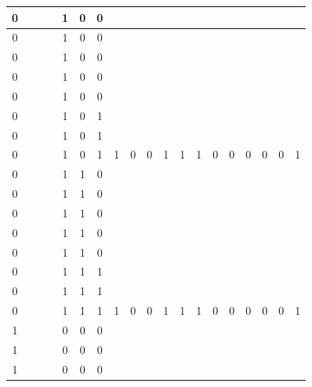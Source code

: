 \begin{table}[!tb]
\begin{tabular}{|c|c|c|c|c|c|c|c|c|c|c|c|c|c|c|c|c|c|c|}
        \rowcolor{red!40} 0 &  &  &  & 1 & 0 & 0 &  &  &  &  &  &  &  &  &  &  &  &  \\ \hline
        \rowcolor{red!40} 0 &  &  &  & 1 & 0 & 0 &  &  &  &  &  &  &  &  &  &  &  &  \\ \hline
        \rowcolor{red!40} 0 &  &  &  & 1 & 0 & 0 &  &  &  &  &  &  &  &  &  &  &  &  \\ \hline
        \rowcolor{red!40} 0 &  &  &  & 1 & 0 & 0 &  &  &  &  &  &  &  &  &  &  &  &  \\ \hline
        \rowcolor{red!40} 0 &  &  &  & 1 & 0 & 0 &  &  &  &  &  &  &  &  &  &  &  &  \\ \hline
        \rowcolor{red!40} 0 &  &  &  & 1 & 0 & 1 &  &  &  &  &  &  &  &  &  &  &  &  \\ \hline
        \rowcolor{red!40} 0 &  &  &  & 1 & 0 & 1 &  &  &  &  &  &  &  &  &  &  &  &  \\ \hline
        \rowcolor{red!40} 0 &  &  &  & 1 & 0 & 1 & 1 & 0 & 0 & 1 & 1 & 1 & 0 & 0 & 0 & 0 & 0 & 1 \\ \hline
        \rowcolor{green!40} 0 &  &  &  & 1 & 1 & 0 &  &  &  &  &  &  &  &  &  &  &  &  \\ \hline
        \rowcolor{green!40} 0 &  &  &  & 1 & 1 & 0 &  &  &  &  &  &  &  &  &  &  &  &  \\ \hline
        \rowcolor{green!40} 0 &  &  &  & 1 & 1 & 0 &  &  &  &  &  &  &  &  &  &  &  &  \\ \hline
        \rowcolor{green!40} 0 &  &  &  & 1 & 1 & 0 &  &  &  &  &  &  &  &  &  &  &  &  \\ \hline
        \rowcolor{green!40} 0 &  &  &  & 1 & 1 & 0 &  &  &  &  &  &  &  &  &  &  &  &  \\ \hline
        \rowcolor{green!40} 0 &  &  &  & 1 & 1 & 1 &  &  &  &  &  &  &  &  &  &  &  &  \\ \hline
        \rowcolor{green!40} 0 &  &  &  & 1 & 1 & 1 &  &  &  &  &  &  &  &  &  &  &  &  \\ \hline
        \rowcolor{green!40} 0 &  &  &  & 1 & 1 & 1 & 1 & 0 & 0 & 1 & 1 & 1 & 0 & 0 & 0 & 0 & 0 & 1 \\ \hline
        \rowcolor{yellow!40} 1 &  &  &  & 0 & 0 & 0 &  &  &  &  &  &  &  &  &  &  &  &  \\ \hline
        \rowcolor{yellow!40} 1 &  &  &  & 0 & 0 & 0 &  &  &  &  &  &  &  &  &  &  &  &  \\ \hline
        \rowcolor{yellow!40} 1 &  &  &  & 0 & 0 & 0 &  &  &  &  &  &  &  &  &  &  &  &  \\ \hline

\end{tabular}
\end{table}

